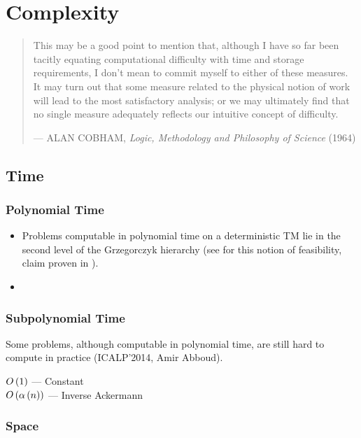 
\chapter{Complexity}

\begin{quotation}

\footnotesize\sffamily\itshape

\begin{flushright}

This may be a good point to mention that, although I have so far been tacitly
equating computational difficulty with time and storage requirements, I don't
mean to commit myself to either of these measures. It may turn out that some
measure related to the physical notion of work will lead to the most
satisfactory analysis; or we may ultimately find that no single measure
adequately reflects our intuitive concept of difficulty.

\smallbreak

\upshape

--- ALAN COBHAM, {\itshape Logic, Methodology and Philosophy of Science} (1964)

\end{flushright}

\end{quotation}

\section{Time}

\subsection{Polynomial Time}

\begin{itemize}

\item Problems computable in polynomial time on a deterministic TM lie in the
second level of the Grzegorczyk hierarchy \cite{grzegorczyk-1953} (see
\cite{cobham-1965} for this notion of feasibility, claim proven in
\cite{rose-1984}). 

\item 

\end{itemize}

\subsection{Subpolynomial Time}

Some problems, although computable in polynomial time, are still hard to
compute in practice (ICALP'2014, Amir Abboud).

\begin{description}

\item[$O\left({1}\right)$ --- Constant]

\item[$O\left({\alpha\left({n}\right)}\right)$ --- Inverse Ackermann]

\end{description}

\subsection{Space}
